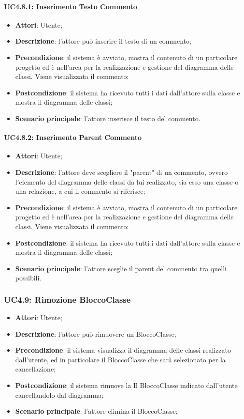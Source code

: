 \paragraph{UC4.8.1: Inserimento Testo Commento}
\label{UC4.8.1}
\begin{itemize}
	\item \textbf{Attori}: Utente;
	\item \textbf{Descrizione}: l'attore può inserire il testo di un commento;
	\item \textbf{Precondizione}: il sistema è avviato, mostra il contenuto di un particolare progetto ed è nell'area per la realizzazione e gestione del diagramma delle classi. Viene visualizzata il commento;
	\item \textbf{Postcondizione}: il sistema ha ricevuto tutti i dati dall'attore sulla classe e mostra il diagramma delle classi;
	\item \textbf{Scenario principale}: l'attore inserisce il testo del commento.
\end{itemize}

\paragraph{UC4.8.2: Inserimento Parent Commento}
\label{UC4.8.2}
\begin{itemize}
	\item \textbf{Attori}: Utente;
	\item \textbf{Descrizione}: l'attore deve scegliere il "parent" di un commento, ovvero l'elemento del diagramma delle classi da lui realizzato, sia esso una classe o una relazione, a cui il commento si riferisce;
	\item \textbf{Precondizione}: il sistema è avviato, mostra il contenuto di un particolare progetto ed è nell'area per la realizzazione e gestione del diagramma delle classi. Viene visualizzata il commento;
	\item \textbf{Postcondizione}: il sistema ha ricevuto tutti i dati dall'attore sulla classe e mostra il diagramma delle classi;
	\item \textbf{Scenario principale}: l'attore sceglie il parent del commento tra quelli possibili.
\end{itemize}

\subsubsection{UC4.9: Rimozione BloccoClasse}
\label{UC4.9}
\begin{itemize}
	\item \textbf{Attori}: Utente;
	\item \textbf{Descrizione}: l'attore può rimuovere un BloccoClasse;
	\item \textbf{Precondizione}: il sistema visualizza il diagramma delle classi realizzato dall'utente, ed in particolare il BloccoClasse che sarà selezionato per la cancellazione;
	\item \textbf{Postcondizione}: il sistema rimuove la Il BloccoClasse indicato dall'utente cancellandolo dal diagramma;
	\item \textbf{Scenario principale}: l'attore elimina il BloccoClasse;
\end{itemize}

